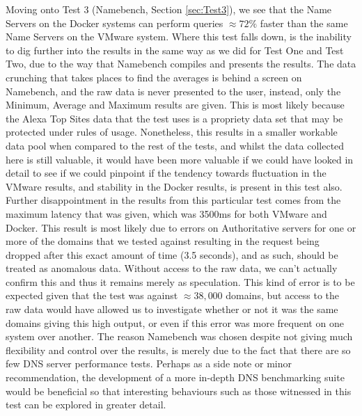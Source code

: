 Moving onto Test 3 (Namebench, Section \ref{sec:Test3}), we see that the Name Servers on the Docker systems can perform queries \(\approx72\%\) faster than the same Name Servers on the VMware system. Where this test falls down, is the inability to dig further into the results in the same way as we did for Test One and Test Two, due to the way that Namebench compiles and presents the results. The data crunching that takes places to find the averages is behind a screen on Namebench, and the raw data is never presented to the user, instead, only the Minimum, Average and Maximum results are given. This is most likely because the Alexa Top Sites data that the test uses is a propriety data set that may be protected under rules of usage. Nonetheless, this results in a smaller workable data pool when compared to the rest of the tests, and whilst the data collected here is still valuable, it would have been more valuable if we could have looked in detail to see if we could pinpoint if the tendency towards fluctuation in the VMware results, and stability in the Docker results, is present in this test also. Further disappointment in the results from this particular test comes from the maximum latency that was given, which was 3500ms for both VMware and Docker. This result is most likely due to errors on Authoritative servers for one or more of the domains that we tested against resulting in the request being dropped after this exact amount of time (3.5 seconds), and as such, should be treated as anomalous data. Without access to the raw data, we can't actually confirm this and thus it remains merely as speculation. This kind of error is to be expected given that the test was against \(\approx 38,000\) domains, but access to the raw data would have allowed us to investigate whether or not it was the same domains giving this high output, or even if this error was more frequent on one system over another. The reason Namebench was chosen despite not giving much flexibility and control over the results, is merely due to the fact that there are so few DNS server performance tests. Perhaps as a side note or minor recommendation, the development of a more in-depth DNS benchmarking suite would be beneficial so that interesting behaviours such as those witnessed in this test can be explored in greater detail.

